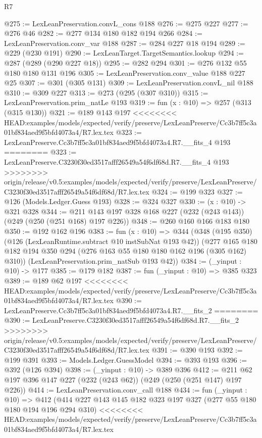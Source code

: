 \begin{lexlean}{R7}
\begin{coremodule}
{{{{{{{{{{{{{@275 := LexLeanPreservation.convL_cons @188
@276 := @275 @227
@277 := @276 @46
@282 := @277 @134 @180 @182 @194 @266
@284 := LexLeanPreservation.conv_var @188
@287 := @284 @227 @18 @194
@289 := @229 (@230 @191)
@290 := LexLeanTarget.TargetSemantics.lookup
@294 := @287 (@289 (@290 @227 @18))
@295 := @282 @294
@301 := @276 @132 @55 @180 @180 @131 @196
@305 := LexLeanPreservation.conv_value @188 @227 @25
@307 := @301 (@305 @131)
@309 := LexLeanPreservation.convL_nil @188
@310 := @309 @227
@313 := @273 (@295 (@307 @310))
@315 := LexLeanPreservation.prim_natLe @193
@319 := fun (x : @10) => @257 (@313 (@315 @130))
@321 := @189 @143 @197
<<<<<<<< HEAD:examples/models/expected/verify/preserve/LexLeanPreserve/Cc3b7ff5c3a01bf834aed9f5bfd4073a4/R7.lex.tex
@323 := LexLeanPreserve.Cc3b7ff5c3a01bf834aed9f5bfd4073a4.R7.__fits_4 @193
========
@323 := LexLeanPreserve.C3230f30ed3517afff26549a54f6df68d.R7.__fits_4 @193
>>>>>>>> origin/release/v0.5:examples/models/expected/verify/preserve/LexLeanPreserve/C3230f30ed3517afff26549a54f6df68d/R7.lex.tex
@324 := @199 @323
@327 := @126 (Models.Ledger.Guess @193)
@328 := @324 @327
@330 := (x : @10) -> @321 @328
@344 := @211 @143 @197 @328 @168 @227 (@232 (@243 @143)) (@249 (@250 (@251 @168) @197 @226))
@348 := @260 @160 @166 @183 @180
@350 := @192 @162 @196
@383 := fun (x : @10) =>
  @344
    (@348
      (@195 @350)
      (@126 (LexLeanRuntime.subtract @10 instSubNat @193 @42))
      (@277 @165 @180 @182 @194 @350 @294 (@276 @163 @55 @180 @180 @162 @196 (@305 @162) @310))
      (LexLeanPreservation.prim_natSub @193 @42))
@384 := (_yinput : @10) -> @177
@385 := @179 @182
@387 := fun (_yinput : @10) => @385 @323
@389 := @189 @62 @197
<<<<<<<< HEAD:examples/models/expected/verify/preserve/LexLeanPreserve/Cc3b7ff5c3a01bf834aed9f5bfd4073a4/R7.lex.tex
@390 := LexLeanPreserve.Cc3b7ff5c3a01bf834aed9f5bfd4073a4.R7.__fits_2
========
@390 := LexLeanPreserve.C3230f30ed3517afff26549a54f6df68d.R7.__fits_2
>>>>>>>> origin/release/v0.5:examples/models/expected/verify/preserve/LexLeanPreserve/C3230f30ed3517afff26549a54f6df68d/R7.lex.tex
@391 := @390 @193
@392 := @199 @391
@393 := Models.Ledger.GuessModel
@394 := @393 @193
@396 := @392 (@126 @394)
@398 := (_yinput : @10) -> @389 @396
@412 := @211 @62 @197 @396 @147 @227 (@232 (@243 @62)) (@249 (@250 (@251 @147) @197 @226))
@414 := LexLeanPreservation.conv_call @188
@434 := fun (_yinput : @10) =>
  @412
    (@414
      @227
      @143
      @145
      @182
      @323
      @197
      @327
      (@277 @55 @180 @180 @194 @196 @294 @310)
<<<<<<<< HEAD:examples/models/expected/verify/preserve/LexLeanPreserve/Cc3b7ff5c3a01bf834aed9f5bfd4073a4/R7.lex.tex
}}}}}}}}}}}}}
\end{coremodule}
\end{lexlean}
